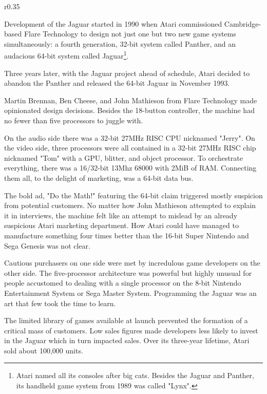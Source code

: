 \begin{wrapfigure}[5]{r}{0.35\textwidth}{
\centering {}}
\end{wrapfigure}
Development of the Jaguar started in 1990 when Atari commissioned Cambridge-based Flare Technology to design not just one but two new game systems simultaneously: a fourth generation, 32-bit system called Panther, and an audacious 64-bit system called Jaguar\footnote{Atari named all its consoles after big cats. Besides the Jaguar and Panther, its handheld game system from 1989 was called "Lynx".}.
\par Three years later, with the Jaguar project ahead of schedule, Atari decided to abandon the Panther and released the 64-bit Jaguar in November 1993.\\
\par
{}
\par
Martin Brennan, Ben Cheese, and John Mathieson from Flare Technology made opinionated design decisions. Besides the 18-button controller, the machine had no fewer than five processors to juggle with.\\
\par
On the audio side there was a 32-bit 27MHz RISC CPU nicknamed "Jerry". On the video side, three processors were all contained in a 32-bit 27MHz RISC chip nicknamed "Tom" with a GPU, blitter, and object processor. To orchestrate everything, there was a 16/32-bit 13Mhz 68000 with 2MiB of RAM. Connecting them all, to the delight of marketing, was a 64-bit data bus.\\
\par
The bold ad, "Do the Math!" featuring the 64-bit claim triggered mostly suspicion from potential customers.  No matter how John Mathieson attempted to explain it in interviews, the machine felt like an attempt to mislead by an already suspicious Atari marketing department. How Atari could have managed to manufacture something four times better than the 16-bit Super Nintendo and Sega Genesis was not clear.
\par
Cautious purchasers on one side were met by incredulous game developers on the other side. The five-processor architecture was powerful but highly unusual for people accustomed to dealing with a single processor on the 8-bit Nintendo Entertainment System or Sega Master System. Programming the Jaguar was an art that few took the time to learn.\\
\par
The limited library of games available at launch prevented the formation of a critical mass of customers. Low sales figures made developers less likely to invest in the Jaguar which in turn impacted sales. Over its three-year lifetime, Atari sold about 100,000 units. 


